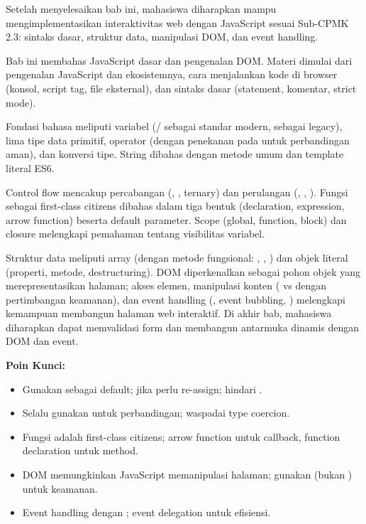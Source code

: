 \documentclass[../main.tex]{subfiles}
\begin{document}
\begin{rangkuman}
Setelah menyelesaikan bab ini, mahasiswa diharapkan mampu mengimplementasikan interaktivitas web dengan JavaScript sesuai Sub-CPMK 2.3: sintaks dasar, struktur data, manipulasi DOM, dan event handling.

Bab ini membahas JavaScript dasar dan pengenalan DOM. Materi dimulai dari pengenalan JavaScript dan ekosistemnya, cara menjalankan kode di browser (konsol, script tag, file eksternal), dan sintaks dasar (statement, komentar, strict mode).

Fondasi bahasa meliputi variabel (/ sebagai standar modern,  sebagai legacy), lima tipe data primitif, operator (dengan penekanan pada \code{===} untuk perbandingan aman), dan konversi tipe. String dibahas dengan metode umum dan template literal ES6.

Control flow mencakup percabangan (, , ternary) dan perulangan (, , ). Fungsi sebagai first-class citizens dibahas dalam tiga bentuk (declaration, expression, arrow function) beserta default parameter. Scope (global, function, block) dan closure melengkapi pemahaman tentang visibilitas variabel.

Struktur data meliputi array (dengan metode fungsional: , , ) dan objek literal (properti, metode, destructuring). DOM diperkenalkan sebagai pohon objek yang merepresentasikan halaman; akses elemen, manipulasi konten ( vs  dengan pertimbangan keamanan), dan event handling (, event bubbling, ) melengkapi kemampuan membangun halaman web interaktif. Di akhir bab, mahasiswa diharapkan dapat memvalidasi form dan membangun antarmuka dinamis dengan DOM dan event.

\textbf{Poin Kunci:}
\begin{itemize}
  \item Gunakan  sebagai default;  jika perlu re-assign; hindari .
  \item Selalu gunakan \code{===} untuk perbandingan; waspadai type coercion.
  \item Fungsi adalah first-class citizens; arrow function untuk callback, function declaration untuk method.
  \item DOM memungkinkan JavaScript memanipulasi halaman; gunakan  (bukan ) untuk keamanan.
  \item Event handling dengan ; event delegation untuk efisiensi.
\end{itemize}
\end{rangkuman}

\ifSubfilesClassLoaded{
  \renewcommand{\bibname}{Daftar Pustaka}
  
  
}{}
\end{document}
